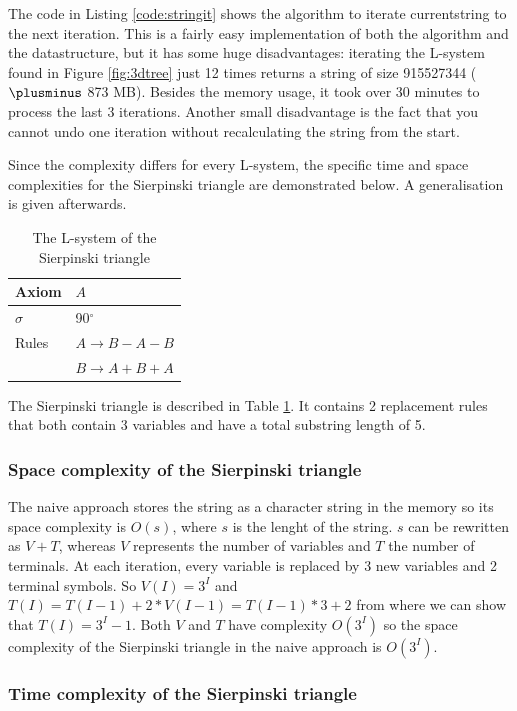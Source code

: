 \documentclass[11pt,a4paper]{article}
\newcommand{\degree}{\ensuremath{^\circ}}
\begin{document}
The code in Listing \ref{code:stringit} shows the algorithm to iterate currentstring to the next iteration. This is a fairly easy implementation of both the algorithm and the datastructure, but it has some huge disadvantages: iterating the L-system found in Figure \ref{fig:3dtree} just 12 times returns a string of size 915527344 ($\plusminus$ 873 MB). Besides the memory usage, it took over 30 minutes to process the last 3 iterations. Another small disadvantage is the fact that you cannot undo one iteration without recalculating the string from the start.

Since the complexity differs for every L-system, the specific time and space complexities for the Sierpinski triangle are demonstrated below. A generalisation is given afterwards.

\begin{table}
\center
\begin{tabular}{l l}
Axiom & $A$ \\ \hline
$\sigma$ & 90\degree \\ \hline
Rules & $A \rightarrow B-A-B$ \\
      & $B \rightarrow A+B+A$ \\
\end{tabular}
\caption{The L-system of the Sierpinski triangle} \label{tbl:siertri}
\end{table}

The Sierpinski triangle is described in Table \ref{tbl:siertri}. It contains 2 replacement rules that both contain 3 variables and have a total substring length of 5.

\subsubsection{Space complexity of the Sierpinski triangle}

The naive approach stores the string as a character string in the memory so its space complexity is $O(s)$, where $s$ is the lenght of the string. $s$ can be rewritten as $V+T$, whereas $V$ represents the number of variables and $T$ the number of terminals. At each iteration, every variable is replaced by 3 new variables and 2 terminal symbols. So $V(I) = 3^I$ and $T(I) = T(I-1) + 2 * V(I-1) = T(I-1)*3 + 2$ from where we can show that $T(I) = 3^I-1$. Both $V$ and $T$ have complexity $O(3^I)$ so the space complexity of the Sierpinski triangle in the naive approach is $O(3^I)$.

\subsubsection{Time complexity of the Sierpinski triangle}
\end{document}
